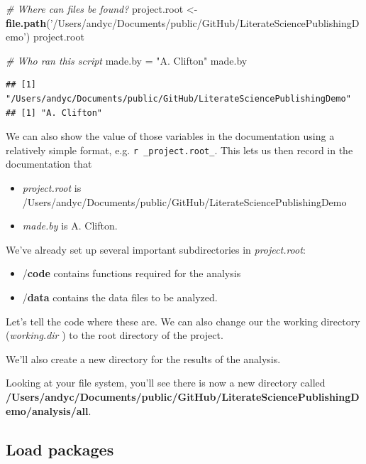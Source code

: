 \documentclass[11pt,]{article}
\newenvironment{Shaded}{\begin{snugshade}}{\end{snugshade}}
\newcommand{\CommentTok}[1]{\textcolor[rgb]{0.56,0.35,0.01}{\textit{#1}}}
\newcommand{\KeywordTok}[1]{\textcolor[rgb]{0.13,0.29,0.53}{\textbf{#1}}}
\newcommand{\NormalTok}[1]{#1}
\newcommand{\StringTok}[1]{\textcolor[rgb]{0.31,0.60,0.02}{#1}}
\providecommand{\tightlist}{%
  \setlength{\itemsep}{0pt}\setlength{\parskip}{0pt}}
\begin{document}
\begin{Shaded}
\begin{Highlighting}[]
\CommentTok{# Where can files be found?}
\NormalTok{project.root <-}\StringTok{ }\KeywordTok{file.path}\NormalTok{(}\StringTok{'/Users/andyc/Documents/public/GitHub/LiterateSciencePublishingDemo'}\NormalTok{)}
\NormalTok{project.root}

\CommentTok{# Who ran this script}
\NormalTok{made.by =}\StringTok{ "A. Clifton"}
\NormalTok{made.by}
\end{Highlighting}
\end{Shaded}

\begin{verbatim}
## [1] "/Users/andyc/Documents/public/GitHub/LiterateSciencePublishingDemo"
## [1] "A. Clifton"
\end{verbatim}

We can also show the value of those variables in the documentation using a relatively simple format, e.g. \texttt{r\ \_project.root\_}. This lets us then record in the documentation that

\begin{itemize}
\tightlist
\item
  \emph{project.root} is /Users/andyc/Documents/public/GitHub/LiterateSciencePublishingDemo
\item
  \emph{made.by} is A. Clifton.
\end{itemize}

We've already set up several important subdirectories in \emph{project.root}:

\begin{itemize}
\tightlist
\item
  /\textbf{code} contains functions required for the analysis
\item
  /\textbf{data} contains the data files to be analyzed.
\end{itemize}

Let's tell the code where these are. We can also change our the working directory (\emph{working.dir} ) to the root directory of the project.

We'll also create a new directory for the results of the analysis.

Looking at your file system, you'll see there is now a new directory called \textbf{/Users/andyc/Documents/public/GitHub/LiterateSciencePublishingDemo/analysis/all}.

\hypertarget{load-packages}{%
\subsection{Load packages}\label{load-packages}}
\end{document}
